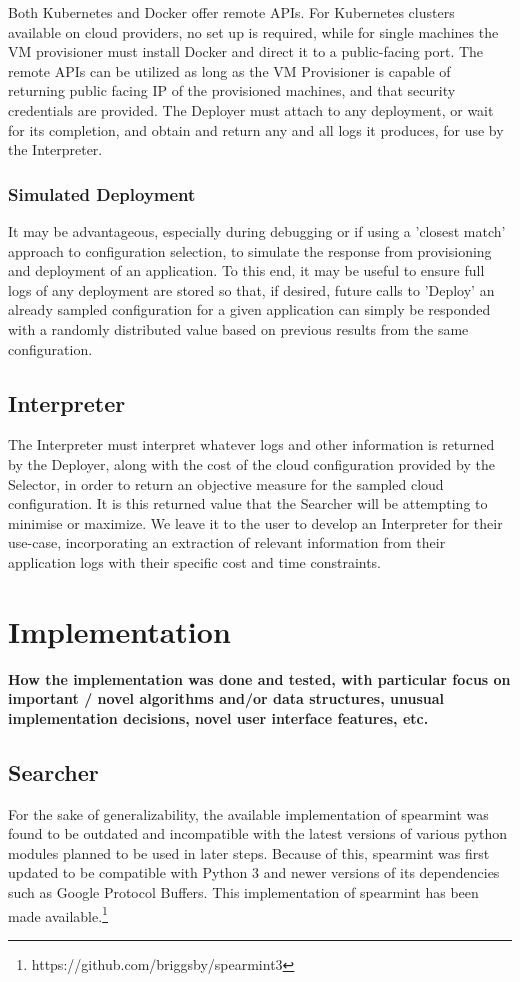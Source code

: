 \documentclass{article}
\begin{document}
Both Kubernetes and Docker offer remote APIs. For Kubernetes clusters available on cloud providers, no set up is required, while for single machines the VM provisioner must install Docker and direct it to a public-facing port. The remote APIs can be utilized as long as the VM Provisioner is capable of returning public facing IP of the provisioned machines, and that security credentials are provided. The Deployer must attach to any deployment, or wait for its completion, and obtain and return any and all logs it produces, for use by the Interpreter.

\subsubsection{Simulated Deployment}
It may be advantageous, especially during debugging or if using a 'closest match' approach to configuration selection, to simulate the response from provisioning and deployment of an application. To this end, it may be useful to ensure full logs of any deployment are stored so that, if desired, future calls to 'Deploy' an already sampled configuration for a given application can simply be responded with a randomly distributed value based on previous results from the same configuration.

\subsection{Interpreter}
The Interpreter must interpret whatever logs and other information is returned by the Deployer, along with the cost of the cloud configuration provided by the Selector, in order to return an objective measure for the sampled cloud configuration. It is this returned value that the Searcher will be attempting to minimise or maximize. We leave it to the user to develop an Interpreter for their use-case, incorporating an extraction of relevant information from their application logs with their specific cost and time constraints. 

\section{Implementation}
\textbf{How the implementation was done and tested, with
particular focus on important / novel algorithms and/or
data structures, unusual implementation decisions, novel
user interface features, etc.}
\subsection{Searcher}
For the sake of generalizability, the available implementation of spearmint was found to be outdated and incompatible with the latest versions of various python modules planned to be used in later steps. 
Because of this, spearmint was first updated to be compatible with Python 3 and newer versions of its dependencies such as Google Protocol Buffers. This implementation of spearmint has been made available.\footnote{https://github.com/briggsby/spearmint3}
\end{document}
